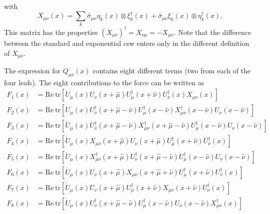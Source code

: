 \documentclass[12pt]{article}
\newcommand{\tr}{\mathrm{tr}}
\newcommand{\re}{\mathrm{Re}}
\begin{document}
with
\begin{equation}
 X_{\mu\nu}(x) = \sum_k \bar{\sigma}_{\mu\nu}\eta_k(x)\otimes\xi_k^\dagger(x) + \bar{\sigma}_{\mu\nu}\xi_k(x)\otimes\eta_k^\dagger(x).
\end{equation}
This matrix has the properties $(X_{\mu\nu})^\dagger=X_{\nu\mu}=-X_{\mu\nu}$. Note that the difference between the standard and exponential csw enters only in the different definition of $X_{\mu\nu}$.

 The expression for $\dot{Q}_{\mu\nu}(x)$ contains eight different terms (two from each of the four leafs). The eight contributions to the force can be written as
\begin{align}
 F_1(x) &=
 \re~\tr[\dot{U}_\mu(x)U_\nu(x+\hat{\mu})U_\mu^\dagger(x+\hat{\nu})U_\nu^\dagger(x)X_{\mu\nu}(x)] \\
 F_2(x) &=
 \re~\tr[\dot{U}_\mu(x)U_\nu^\dagger(x+\hat{\mu}-\hat{\nu})U_\mu^\dagger(x-\hat{\nu})X_{\mu\nu}^\dagger(x-\hat{\nu})U_\nu(x-\hat{\nu})] \\
 F_3(x) &=
 \re~\tr[\dot{U}_\mu(x)U_\nu^\dagger(x+\hat{\mu}-\hat{\nu})X_{\mu\nu}^\dagger(x+\hat{\mu}-\hat{\nu})U_\mu^\dagger(x-\hat{\nu})U_\nu(x-\hat{\nu})] \\
 F_4(x) &=
 \re~\tr[\dot{U}_\mu(x)X_{\mu\nu}(x+\hat{\mu})U_\nu(x+\hat{\mu})U_\mu^\dagger(x+\hat{\nu})U_\nu^\dagger(x)] \\
 F_5(x) &=
 \re~\tr[\dot{U}_\mu(x)X_{\mu\nu}^\dagger(x+\hat{\mu})U_\nu^\dagger(x+\hat{\mu}-\hat{\nu})U_\mu^\dagger(x-\hat{\nu})U_\nu(x-\hat{\nu})] \\
 F_6(x) &=
 \re~\tr[\dot{U}_\mu(x)U_\nu(x+\hat{\mu})X_{\mu\nu}(x+\hat{\mu}+\hat{\nu})U_\mu^\dagger(x+\hat{\nu})U_\nu^\dagger(x)] \\
 F_7(x) &=
 \re~\tr[\dot{U}_\mu(x)U_\nu(x+\hat{\mu})U_\mu^\dagger(x+\hat{\nu})X_{\mu\nu}(x+\hat{\nu})U_\nu^\dagger(x)] \\
 F_8(x) &=
 \re~\tr[\dot{U}_\mu(x)U_\nu^\dagger(x+\hat{\mu}-\hat{\nu})U_\mu^\dagger(x-\hat{\nu})U_\nu(x-\hat{\nu})X_{\mu\nu}^\dagger(x)]
\end{align}
\end{document}

